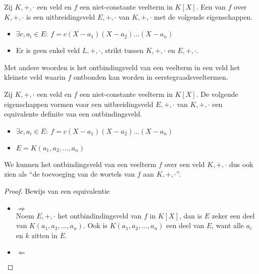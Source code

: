 \documentclass[main.tex]{subfiles}
\begin{document}
\begin{de}
  Zij $K,+,\cdot$ een veld en $f$ een niet-constante veelterm in $K[X]$.
  Een  van $f$ over $K,+,\cdot$ is een uitbreidingsveld $E,+,\cdot$ van $K,+,\cdot$ met de volgende eigenschappen.
  \begin{itemize}
  \item $\exists c, a_{i} \in E:\ f = c(X-a_{1})(X-a_{2})\dotsc(X-a_{n})$
  \item Er is geen enkel veld $L,+,\cdot$, strikt tussen $K,+,\cdot$ en $E,+,\cdot$.
  \end{itemize}
  Met andere woorden is het ontbindingsveld van een veelterm in een veld het kleinste veld waarin $f$ ontbonden kan worden in eerstegraadsveeltermen.
\end{de}

\begin{st}
  Zij $K,+,\cdot$ een veld en $f$ een niet-constante veelterm in $K[X]$.
  De volgende eigenschappen vormen voor een uitbreidingsveld $E,+,\cdot$ van $K,+,\cdot$ een equivalente definite van een ontbindingsveld.
  \begin{itemize}
  \item $\exists c, a_{i} \in E:\ f = c(X-a_{1})(X-a_{2})\dotsc(X-a_{n})$
  \item $E = K(a_{1},a_{2},\dotsc,a_{n})$
  \end{itemize}
  We kunnen het ontbindingsveld van een veelterm $f$ over een veld $K,+,\cdot$ dus ook zien als ``de toevoeging van de wortels van $f$ aan $K,+,\cdot$''.

  \begin{proof}
    Bewijs van een equivalentie
    \begin{itemize}
    \item $\Rightarrow$\\
      Noem $E,+,\cdot$ het ontbindindingsveld van $f$ in $K[X]$, dan is $E$ zeker een deel van $ K(a_{1},a_{2},\dotsc,a_{n})$.\waarom
      Ook is $K(a_{1},a_{2},\dotsc,a_{n})$ een deel van $E$, want alle $a_{i}$ en $k$ zitten in $E$.
      \waarom
    \item $\Leftarrow$\\
    \end{itemize}
  \end{proof}
\end{st}
\end{document}

